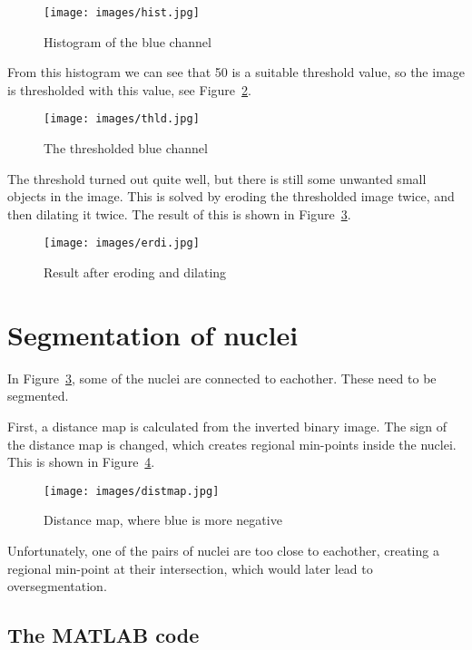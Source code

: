 \documentclass[twocolumn]{article}
\begin{document}
\begin{figure}[h!]
    \centering
    \texttt{[image: images/hist.jpg]}
    \caption{Histogram of the blue channel}
    \label{fig:hist}
\end{figure}

From this histogram we can see that 50 is a suitable threshold value, so the image
is thresholded with this value, see Figure~\ref{fig:thld}.

\begin{figure}[h!]
    \centering
    \texttt{[image: images/thld.jpg]}
    \caption{The thresholded blue channel}
    \label{fig:thld}
\end{figure}

The threshold turned out quite well, but there is still some unwanted small objects
in the image. This is solved by eroding the thresholded image twice, and then
dilating it twice. The result of this is shown in Figure~\ref{fig:erdi}.

\begin{figure}[h!]
    \centering
    \texttt{[image: images/erdi.jpg]}
    \caption{Result after eroding and dilating}
    \label{fig:erdi}
\end{figure}

\section{Segmentation of nuclei}

In Figure~\ref{fig:erdi}, some of the nuclei are connected to eachother. These
need to be segmented.

First, a distance map is calculated from the inverted binary image. The sign of
the distance map is changed, which creates regional min-points inside the
nuclei. This is shown in Figure~\ref{fig:distmap}.

\begin{figure}[h!]
    \centering
    \texttt{[image: images/distmap.jpg]}
    \caption{Distance map, where blue is more negative}
    \label{fig:distmap}
\end{figure}

Unfortunately, one of the pairs of nuclei are too close to eachother, creating
a regional min-point at their intersection, which would later lead to
oversegmentation.

\newpage
\onecolumn
\begin{appendices}

\section{The MATLAB code}

    

\end{appendices}
\end{document}
